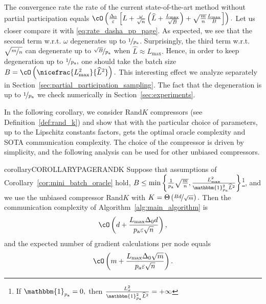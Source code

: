 \documentclass{article}
\newcommand{\algorithmname}{DASHA-PP}
\newcommand*{\probavailable}{\ensuremath{p_{\textnormal{a}}}}
\begin{document}
The convergence rate the rate of the current state-of-the-art method  without partial participation equals
$\cO\left(\frac{\Delta_0}{\varepsilon}\left[L + \frac{\omega}{\sqrt{n}}\left(\widehat{L} + \frac{L_{\max}}{\sqrt{B}}\right) + \sqrt{\frac{m}{n}}\frac{L_{\max}}{B}\right]\right).$ Let us closer compare it with \eqref{eq:rate_dasha_pp_page}. As expected, we see that the second term w.r.t. $\omega$ degenerates up to $\nicefrac{1}{\probavailable}$. Surprisingly, the third term w.r.t. $\sqrt{\nicefrac{m}{n}}$ can degenerate up to $\nicefrac{\sqrt{B}}{\probavailable}$ when $\widehat{L} \approx L_{\max}.$ Hence, in order to keep degeneration up to $\nicefrac{1}{\probavailable},$ one should take the batch size $B = \cO\left(\nicefrac{L_{\max}^2}{\widehat{L}^2}\right).$ This interesting effect we analyze separately in Section~\ref{sec:partial_participation_sampling}. The fact that the degeneration is up to $\nicefrac{1}{\probavailable}$ we check numerically in Section~\ref{sec:experiments}.

In the following corollary, we consider Rand$K$ compressors (see Definition~\ref{def:rand_k}) and show that with the particular choice of parameters, up to the Lipschitz constants factors, \algname{\algorithmname-PAGE} gets the optimal oracle complexity and SOTA communication complexity. The choice of the compressor is driven by simplicity, and the following analysis can be used for other unbiased compressors.

\begin{restatable}{corollary}{COROLLARYPAGERANDK}
  \label{cor:mini_batch_oracle:randk}
  Suppose that assumptions of Corollary~\ref{cor:mini_batch_oracle} hold, $B \leq \min\left\{\frac{1}{\probavailable}\sqrt{\frac{m}{n}},\frac{L_{\max}^2}{\mathbbm{1}_{\probavailable}^2 \widehat{L}^2}\right\}$\footnote{If $\mathbbm{1}_{\probavailable} = 0,$ then $\frac{L_{\sigma}^2}{\mathbbm{1}_{\probavailable}^2 \widehat{L}^2} = +\infty$}, and we use the unbiased compressor Rand$K$ with $K = \Theta\left(\nicefrac{B d}{\sqrt{m}}\right).$ Then
  the communication complexity of Algorithm~\ref{alg:main_algorithm} is
  \begin{align}
      \label{eq:complexity:mini_batch_oracle:communication}
      \cO\left(d + \frac{L_{\max} \Delta_0 d}{\probavailable \varepsilon \sqrt{n}}\right),
  \end{align}
and the expected number of gradient calculations per node equals
  \begin{align}
      \label{eq:complexity:mini_batch_oracle}
      \cO\left(m + \frac{L_{\max} \Delta_0 \sqrt{m}}{\probavailable \varepsilon \sqrt{n}} \right).
  \end{align}
\end{restatable}
\end{document}
